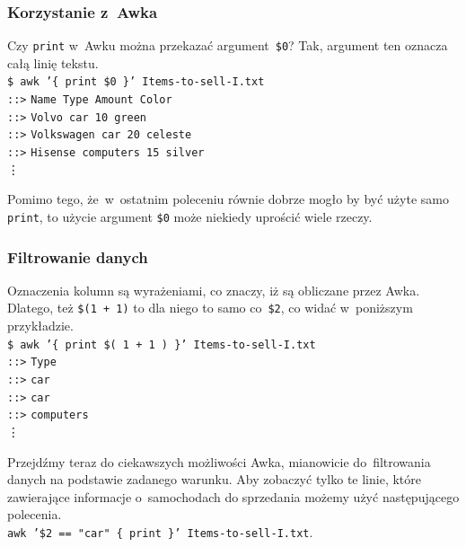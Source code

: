 \documentclass[10pt,t]{beamer}
\begin{document}
\begin{frame}
  \frametitle{Korzystanie z~Awka}


  Czy \texttt{print} w~Awku można przekazać argument~\texttt{\$0}?
  Tak, argument ten oznacza całą linię tekstu. \\
  \texttt{\$ awk '\{ print \$0 \}' Items-to-sell-I.txt} \\
  \texttt{::>} \texttt{Name Type Amount Color} \\
  \texttt{::>} \texttt{Volvo car 10 green} \\
  \texttt{::>} \texttt{Volkswagen car 20 celeste} \\
  \texttt{::>} \texttt{Hisense computers 15 silver} \\
  \hspace{3em} \vdots

  Pomimo tego, że~w~ostatnim poleceniu równie dobrze mogło by być użyte
  samo \texttt{print}, to użycie argument \texttt{\$0} może niekiedy
  uprościć wiele rzeczy.

\end{frame}





\begin{frame}
  \frametitle{Filtrowanie danych}


  Oznaczenia kolumn są \alert{wyrażeniami}, co znaczy, iż są obliczane
  przez Awka. Dlatego, też \texttt{\$(1 + 1)} to dla niego to samo
  co~\texttt{\$2}, co widać w~poniższym przykładzie. \\
  \texttt{\$ awk '\{ print \$( 1 + 1 ) \}' Items-to-sell-I.txt} \\
  \texttt{::>} \texttt{Type} \\
  \texttt{::>} \texttt{car} \\
  \texttt{::>} \texttt{car} \\
  \texttt{::>} \texttt{computers} \\
  \hspace{3em} \vdots

  Przejdźmy teraz do ciekawszych możliwości Awka, mianowicie do~filtrowania
  danych na podstawie zadanego warunku. Aby zobaczyć tylko te linie, które
  zawierające informacje o~samochodach do sprzedania możemy użyć
  następującego polecenia. \\
  \texttt{awk '\$2 == "car" \hspace{0.25em} \{ print \}' Items-to-sell-I.txt}.

\end{frame}
\end{document}
